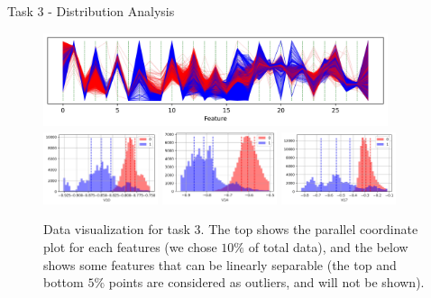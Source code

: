 \documentclass{beamer}
\begin{document}
\begin{frame}{Task 3 - Distribution Analysis}

  \begin{figure}[H]
    \centering
    \includegraphics[width=0.9\textwidth]{../code/Task3/Analysis/PC.jpg} \\
    \includegraphics[width=0.3\textwidth]{../code/Task3/Analysis/Hist-9.jpg}
    \includegraphics[width=0.3\textwidth]{../code/Task3/Analysis/Hist-13.jpg}
    \includegraphics[width=0.3\textwidth]{../code/Task3/Analysis/Hist-16.jpg}
    \caption{Data visualization for task 3. The top shows the parallel coordinate plot for each features (we chose $10\%$ of total data), and the below shows some features that can be linearly separable (the top and bottom $5\%$ points are considered as outliers, and will not be shown).}
  \end{figure}

\end{frame}
\end{document}
